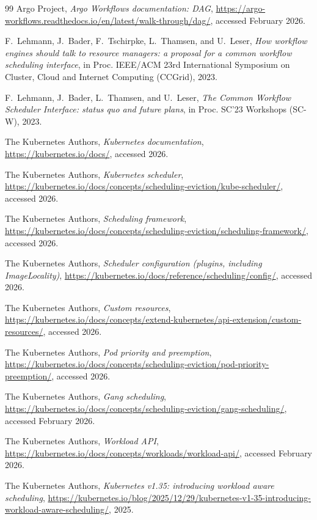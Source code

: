 \documentclass[12pt,a4paper]{report}
\begin{document}
\begin{thebibliography}{99}
Argo Project, \emph{Argo Workflows documentation: DAG},
\url{https://argo-workflows.readthedocs.io/en/latest/walk-through/dag/},
accessed February 2026.

F.~Lehmann, J.~Bader, F.~Tschirpke, L.~Thamsen, and U.~Leser, \emph{How
workflow engines should talk to resource managers: a proposal for a
common workflow scheduling interface}, in Proc. IEEE/ACM 23rd
International Symposium on Cluster, Cloud and Internet Computing
(CCGrid), 2023.

F.~Lehmann, J.~Bader, L.~Thamsen, and U.~Leser, \emph{The Common Workflow
Scheduler Interface: status quo and future plans}, in Proc. SC'23
Workshops (SC-W), 2023.

The Kubernetes Authors, \emph{Kubernetes documentation},
\url{https://kubernetes.io/docs/}, accessed 2026.

The Kubernetes Authors, \emph{Kubernetes scheduler},
\url{https://kubernetes.io/docs/concepts/scheduling-eviction/kube-scheduler/},
accessed 2026.

The Kubernetes Authors, \emph{Scheduling framework},
\url{https://kubernetes.io/docs/concepts/scheduling-eviction/scheduling-framework/},
accessed 2026.

The Kubernetes Authors, \emph{Scheduler configuration (plugins, including
ImageLocality)}, \url{https://kubernetes.io/docs/reference/scheduling/config/},
accessed 2026.

The Kubernetes Authors, \emph{Custom resources},
\url{https://kubernetes.io/docs/concepts/extend-kubernetes/api-extension/custom-resources/},
accessed 2026.

The Kubernetes Authors, \emph{Pod priority and preemption},
\url{https://kubernetes.io/docs/concepts/scheduling-eviction/pod-priority-preemption/},
accessed 2026.

The Kubernetes Authors, \emph{Gang scheduling},
\url{https://kubernetes.io/docs/concepts/scheduling-eviction/gang-scheduling/},
accessed February 2026.

The Kubernetes Authors, \emph{Workload API},
\url{https://kubernetes.io/docs/concepts/workloads/workload-api/},
accessed February 2026.

The Kubernetes Authors, \emph{Kubernetes v1.35: introducing workload aware
scheduling},
\url{https://kubernetes.io/blog/2025/12/29/kubernetes-v1-35-introducing-workload-aware-scheduling/},
2025.


\end{thebibliography}
\end{document}
